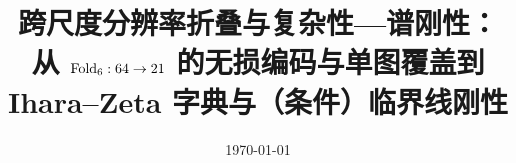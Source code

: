 \documentclass[11pt,letterpaper]{ctexart}
\title{跨尺度分辨率折叠与复杂性—谱刚性：从 $\mathrm{Fold}_6:64\to 21$ 的无损编码与单图覆盖到 Ihara--Zeta 字典与（条件）临界线刚性}
\author{}
\date{\today}
\begin{document}
\maketitle














\FloatBarrier
\appendix


\FloatBarrier

\end{document}
